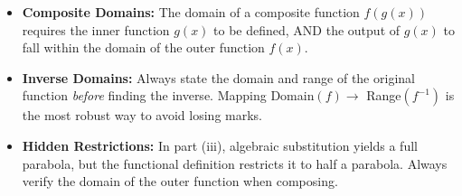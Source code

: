 \begin{solution}
\begin{center}
\end{center}
\end{solution}

\begin{takeaways}
\begin{itemize}[leftmargin=*]
    \item \textbf{Composite Domains:} The domain of a composite function $f(g(x))$ requires the inner function $g(x)$ to be defined, AND the output of $g(x)$ to fall within the domain of the outer function $f(x)$.
    \item \textbf{Inverse Domains:} Always state the domain and range of the original function \textit{before} finding the inverse. Mapping Domain$(f) \rightarrow$ Range$(f^{-1})$ is the most robust way to avoid losing marks.
    \item \textbf{Hidden Restrictions:} In part (iii), algebraic substitution yields a full parabola, but the functional definition restricts it to half a parabola. Always verify the domain of the outer function when composing.
\end{itemize}
\end{takeaways}
